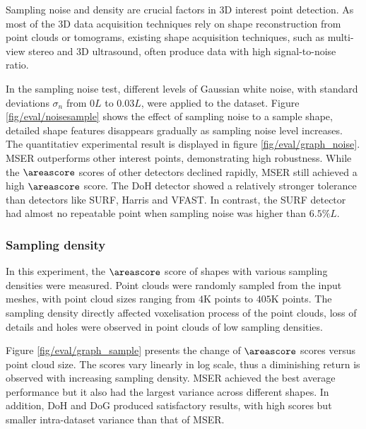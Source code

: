 Sampling noise and density are crucial factors in 3D interest point detection. As most of the 3D data acquisition techniques rely on shape reconstruction from point clouds or tomograms, existing shape acquisition techniques, such as multi-view stereo and 3D ultrasound, often produce data with high signal-to-noise ratio. 

In the sampling noise test, different levels of Gaussian white noise, with standard deviations $\sigma_{n}$ from $0L$ to $0.03L$, were applied to the \meshset dataset. Figure \ref{fig/eval/noisesample} shows the effect of sampling noise to a sample shape, detailed shape features disappears gradually as sampling noise level increases. 
The quantitatiev experimental result is displayed in figure \ref{fig/eval/graph_noise}. MSER outperforms other interest points, demonstrating high robustness. While the $\areascore$ scores of other detectors declined rapidly, MSER still achieved a high $\areascore$ score. The DoH detector showed a relatively stronger tolerance than detectors like SURF, Harris and VFAST. In contrast, the SURF detector had almost no repeatable point when sampling noise was higher than $6.5\%L$.

\subsubsection{Sampling density}

In this experiment, the $\areascore$ score of shapes with various sampling densities were measured. Point clouds were randomly sampled from the input meshes, with point cloud sizes ranging from $4$K points to $405$K points. The sampling density directly affected voxelisation process of the point clouds, loss of details and holes were observed in point clouds of low sampling densities. 

Figure \ref{fig/eval/graph_sample} presents the change of $\areascore$ scores versus point cloud size. The scores vary linearly in log scale, thus a diminishing return is observed with increasing sampling density. MSER achieved the best average performance but it also had the largest variance across different shapes. In addition, DoH and DoG produced satisfactory results, with high scores but smaller intra-dataset variance than that of MSER.

